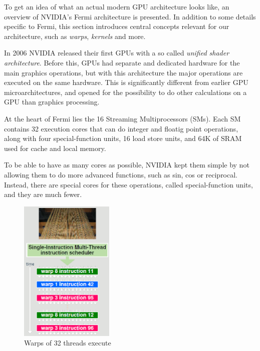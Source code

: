 \documentclass[../main/report.tex]{subfiles}
\begin{document}
To get an idea of what an actual modern GPU architecture looks like, an overview of NVIDIA's Fermi architecture is presented.
In addition to some details specific to Fermi, this section introduces central concepts relevant for our architecture, such as \emph{warps}, \emph{kernels} and more.




In 2006 NVIDIA released their first GPUs with a so called \emph{unified shader architecture}.
Before this, GPUs had separate and dedicated hardware for the main graphics operations, 
but with this architecture the major operations are executed on the same hardware.
This is significantly different from earlier GPU microarchitectures, and opened
for the possibility to do other calculations on a GPU than graphics processing.

At the heart of Fermi lies the 16 Streaming Multiprocessors (SMs). 
Each SM contains 32 execution cores that can do integer and floatig point operations, 
along with four special-function units, 16 load store units, 
and 64K of SRAM used for cache and local memory.

To be able to have as many cores as possible, NVIDIA kept them simple by not allowing them to do more advanced functions, such as sin, cos or reciprocal.
Instead, there are special cores for these operations, called special-function units, and they are much fewer.

\begin{figure}[H]
\centering
\includegraphics[width=0.4\textwidth]{../introduction/assets/warp.png}
\caption{Warps of 32 threads execute }
\label{fig:simple-nvidia-warps}
\end{figure}
\end{document}
